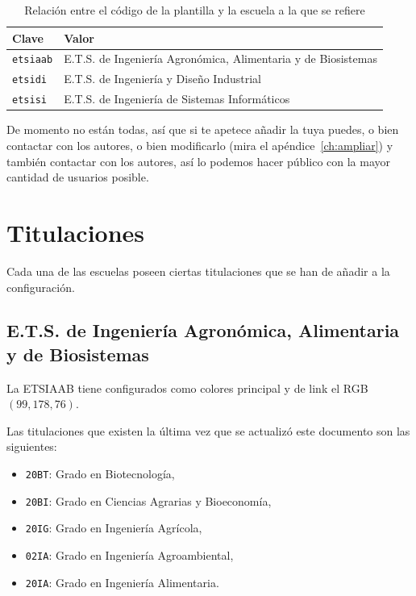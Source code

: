 \documentclass[%
    school=etsisi,%
    type=pfg,%
    degree=61CD,%
]{upm-report}
\begin{document}
\begin{table}
    \centering
    \begin{tabularx}{\textwidth}{@{}lX@{}}
        \toprule
        \textbf{Clave}   & \textbf{Valor} \\
        \midrule
        \texttt{etsiaab} & E.T.S. de Ingeniería Agronómica, Alimentaria y de Biosistemas \\
        \texttt{etsidi}  & E.T.S. de Ingeniería y Diseño Industrial \\
        \texttt{etsisi}  & E.T.S. de Ingeniería de Sistemas Informáticos \\
        \bottomrule
    \end{tabularx}
    \caption{\label{tbl:schools} Relación entre el código de la plantilla y la escuela a la que se refiere}
\end{table}

De momento no están todas, así que si te apetece añadir la tuya puedes, o bien contactar con los autores, o bien modificarlo (mira el apéndice~\ref{ch:ampliar}) y también contactar con los autores, así lo podemos hacer público con la mayor cantidad de usuarios posible.

\section{Titulaciones}

Cada una de las escuelas poseen ciertas titulaciones que se han de añadir a la configuración.

\subsection{E.T.S. de Ingeniería Agronómica, Alimentaria y de Biosistemas}

La ETSIAAB tiene configurados como colores principal y de link el RGB $(99,178,76)$.

Las titulaciones que existen la última vez que se actualizó este documento son las siguientes:

\begin{itemize}
    \item \texttt{20BT}: Grado en Biotecnología,
    \item \texttt{20BI}: Grado en Ciencias Agrarias y Bioeconomía,
    \item \texttt{20IG}: Grado en Ingeniería Agrícola,
    \item \texttt{02IA}: Grado en Ingeniería Agroambiental,
    \item \texttt{20IA}: Grado en Ingeniería Alimentaria.
\end{itemize}
\end{document}
